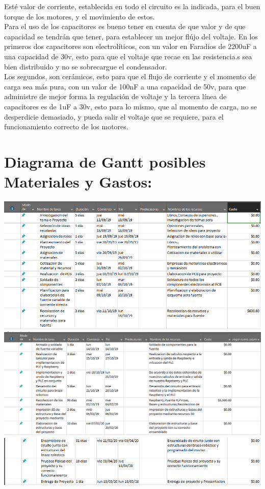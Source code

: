 \documentclass[14pt,a4paper]{article}
\begin{document}
Esté valor de corriente, establecida en todo el circuito es la indicada, para el buen torque de los motores, y el movimiento de estos.\\
Para el uso de los capacitores es bueno tener en cuenta de que valor y de que capacidad se tendrán que tener, para establecer un mejor flújo del voltaje. En los primeros dos capacitores son electrolíticos, con un valor en Faradios de 2200uF a una capacidad de 30v, esto para que el voltaje que recae en las resistencia.s sea bien distribuido y no se sobrecargue el condensador.\\
Los segundos, son cerámicos, esto para que el flujo de corriente y el momento de carga sea más pura, con un valor de 100nF a una capacidad de 50v, para que administre de mejor forma la regulación de voltaje y la tercera línea de capacitores es de 1uF a 30v, esto para lo mismo, que al momento de carga, no se desperdicie demasiado, y pueda salir el voltaje que se requiere, para el funcionamiento correcto de los motores.

\section{Diagrama de Gantt posibles Materiales y Gastos:}

\begin{center}
\includegraphics[width=15cm]{DefinicionTareas/4.png} 
\includegraphics[width=15cm]{DefinicionTareas/5.png} 
\includegraphics[width=15cm]{DefinicionTareas/6.png} 
\end{center}
\end{document}
